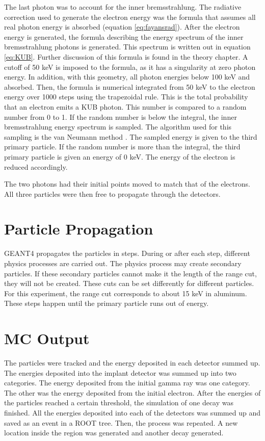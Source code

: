 \documentclass[main.tex]{subfiles}
\begin{document}
The last photon was to account for the inner bremsstrahlung.
The radiative correction used to generate the electron energy was the formula that assumes all real photon energy is absorbed (equation \ref{eq:fayansrad}).
After the electron energy is generated, the formula describing the energy spectrum of the inner bremsstrahlung photons is generated. 
This spectrum is written out in equation \ref{eq:KUB}. %
Further discussion of this formula is found in the theory chapter.
A cutoff of 50 keV is imposed to the formula, as it has a singularity at zero photon energy.
In addition, with this geometry, all photon energies below 100 keV and absorbed.
Then, the formula is numerical integrated from 50 keV to the electron energy over 1000 steps using the trapezoidal rule.
This is the total probability that an electron emits a KUB photon.
This number is compared to a random number from 0 to 1.
If the random number is below the integral, the inner bremsstrahlung energy spectrum is sampled.
The algorithm used for this sampling is the van Neumann method \cite{neu51}.
The sampled energy is given to the third primary particle.
If the random number is more than the integral, the third primary particle is given an energy of 0 keV.
The energy of the electron is reduced accordingly.

The two photons had their initial points moved to match that of the electrons.
All three particles were then free to propagate through the detectors.

\section{Particle Propagation}  
GEANT4 propagates the particles in steps.
During or after each step, different physics processes are carried out.
The physics process may create secondary particles.
If these secondary particles cannot make it the length of the range cut, they will not be created.
These cuts can be set differently for different particles.
For this experiment, the range cut corresponds to about 15 keV in aluminum.
These steps happen until the primary particle runs out of energy.

\section{MC Output}
The particles were tracked and the energy deposited in each detector summed up.
The energies deposited into the implant detector was summed up into two categories.
The energy deposited from the initial gamma ray was one category.
The other was the energy deposited from the initial electron.
After the energies of the particles reached a certain threshold, the simulation of one decay was finished.
All the energies deposited into each of the detectors was summed up and saved as an event in a ROOT tree.
Then, the process was repeated.
A new location inside the region was generated and another decay generated.
\end{document}
